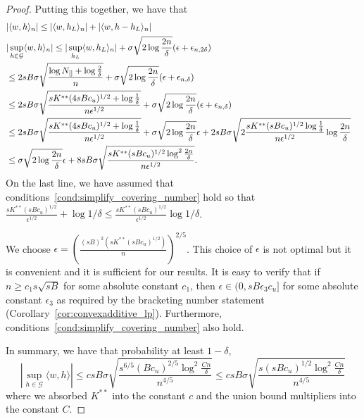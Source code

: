 \documentclass[12pt,pdftex,aos,noinfoline,addressasfootnote]{imsart}
\begin{document}
\begin{proof}
Putting this together, we have that
\begin{align*}
\lefteqn{|\langle w, h \rangle_n | \leq | \langle w, h_L\rangle_n| + |\langle w, h - h_L\rangle_n|}\\
\lefteqn{|\sup_{h \in \mathcal{G}} \langle w, h \rangle_n| \leq 
     | \sup_{h_L} \langle w, h_L \rangle_n | + \sigma \sqrt{2 \log \frac{2n}{\delta}} (\epsilon + \epsilon_{n, 2\delta})} \\
   &\leq   2 sB \sigma \sqrt{ \frac{ \log N_{[]} + \log \frac{2}{\delta}}{n}} + \sigma \sqrt{2 \log \frac{2n}{\delta}} (\epsilon + \epsilon_{n, \delta}) \\
   &\leq  2 sB \sigma \sqrt{ \frac{sK^{**} (4sBc_u)^{1/2} + \log \frac{1}{\delta}}{n \epsilon^{1/2}}} +
   \sigma \sqrt{ 2\log \frac{2n}{\delta}} (\epsilon + \epsilon_{n, \delta}) \\
   &\leq 2 sB \sigma \sqrt{ \frac{sK^{**} (4sBc_u)^{1/2} + \log \frac{1}{\delta}}{n \epsilon^{1/2}}} +
   \sigma\sqrt{2 \log \frac{2n}{\delta}} \epsilon + 2sB \sigma \sqrt{2 \frac{sK^{**} (sBc_u)^{1/2}\log \frac{1}{\delta}}{n \epsilon^{1/2}} \log \frac{2n}{\delta}} \\
   &\leq \sigma\sqrt{2\log \frac{2n}{\delta}} \epsilon + 8 sB \sigma \sqrt{ \frac{sK^{**} (sBc_u)^{1/2} \log^2 \frac{2n}{\delta}}{n \epsilon^{1/2}}}.
\end{align*}
On the last line, we have assumed that conditions~\ref{cond:simplify_covering_number} hold so that $ \frac{sK^{**}(sBc_u)^{1/2}}{\epsilon^{1/2}} + \log 1/\delta \leq \frac{sK^{**} (sBc_u)^{1/2}}{\epsilon^{1/2}} \log 1/\delta$.

We choose $\epsilon = \left( \frac{(sB)^2 (s
    K^{**} (sBc_u)^{1/2})}{n} \right)^{2/5}$. This choice of $\epsilon$ is not optimal but it is convenient and it is sufficient for our results. It is easy to verify that
if $n \geq c_1 s \sqrt{sB}$ for some absolute constant $c_1$, then 
$\epsilon \in (0, sB \epsilon_3c_u]$ for some absolute constant $\epsilon_3$ as required by the bracketing number statement (Corollary~\ref{cor:convexadditive_lp}). Furthermore, conditions~\eqref{cond:simplify_covering_number} also hold. 


In summary, we have that probability at least $1-\delta$,
\[
|\sup_{h \in \mathcal{G}} \langle w, h \rangle | \leq c sB \sigma \sqrt{ 
   \frac{s^{6/5} (Bc_u)^{2/5} \log^2 \frac{Cn}{\delta}}{n^{4/5}}} \leq 
  c sB \sigma \sqrt{ 
   \frac{s (sBc_u)^{1/2} \log^2 \frac{Cn}{\delta}}{n^{4/5}}}
\]
where we absorbed $K^{**}$ into the constant $c$ and the union bound multipliers into the constant $C$.


\end{proof}
\end{document}
